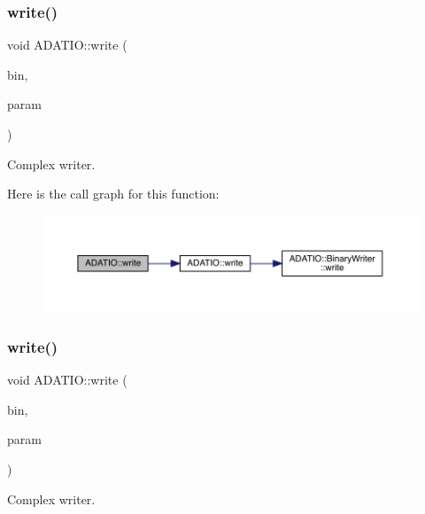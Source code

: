 \subsubsection{\texorpdfstring{write()}{write()}\hspace{0.1cm}{\footnotesize\ttfamily [13/25]}}
{\footnotesize\ttfamily void A\+D\+A\+T\+I\+O\+::write (\begin{DoxyParamCaption}\item[{\mbox{\hyperlink{classADATIO_1_1BinaryWriter}{Binary\+Writer}} \&}]{bin,  }\item[{const std\+::complex$<$ float $>$ \&}]{param }\end{DoxyParamCaption})}



Complex writer. 

Here is the call graph for this function\+:
\nopagebreak
\begin{figure}[H]
\begin{center}
\leavevmode
\includegraphics[width=350pt]{d0/dba/namespaceADATIO_a653bde19d92b24f8269adfa361bdabda_cgraph}
\end{center}
\end{figure}
\mbox{\label{namespaceADATIO_a4d080cdbb3d8b34b2e8cf03001f8b7f0}} 
\subsubsection{\texorpdfstring{write()}{write()}\hspace{0.1cm}{\footnotesize\ttfamily [14/25]}}
{\footnotesize\ttfamily void A\+D\+A\+T\+I\+O\+::write (\begin{DoxyParamCaption}\item[{\mbox{\hyperlink{classADATIO_1_1BinaryWriter}{Binary\+Writer}} \&}]{bin,  }\item[{const std\+::complex$<$ double $>$ \&}]{param }\end{DoxyParamCaption})}



Complex writer. 

